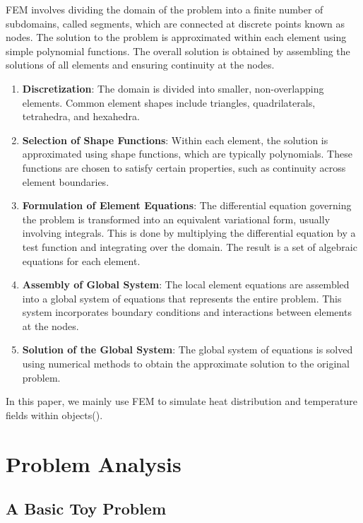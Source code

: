 \documentclass{article}
\begin{document}
FEM involves dividing the domain of the problem into a finite number of subdomains, called segments, which are connected at discrete points known as nodes. The solution to the problem is approximated within each element using simple polynomial functions. The overall solution is obtained by assembling the solutions of all elements and ensuring continuity at the nodes.

\begin{enumerate}
    \item \textbf{Discretization}: The domain is divided into smaller, non-overlapping elements. Common element shapes include triangles, quadrilaterals, tetrahedra, and hexahedra.
    \item \textbf{Selection of Shape Functions}: Within each element, the solution is approximated using shape functions, which are typically polynomials. These functions are chosen to satisfy certain properties, such as continuity across element boundaries.
    \item \textbf{Formulation of Element Equations}: The differential equation governing the problem is transformed into an equivalent variational form, usually involving integrals. This is done by multiplying the differential equation by a test function and integrating over the domain. The result is a set of algebraic equations for each element.
    \item \textbf{Assembly of Global System}: The local element equations are assembled into a global system of equations that represents the entire problem. This system incorporates boundary conditions and interactions between elements at the nodes.
    \item \textbf{Solution of the Global System}: The global system of equations is solved using numerical methods to obtain the approximate solution to the original problem. 
\end{enumerate}
In this paper, we mainly use FEM to simulate heat distribution and temperature fields within objects(\textcite{PDE_t}).

    
    \section{Problem Analysis}
    \subsection{A Basic Toy Problem}
\end{document}
